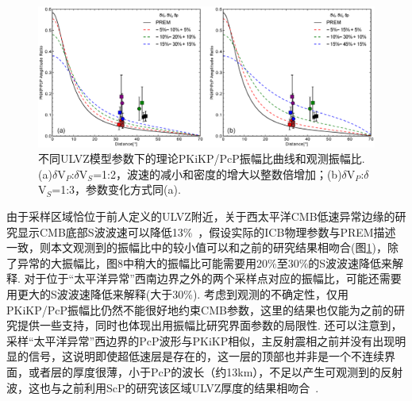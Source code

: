 
\begin{figure}[ht]
\centering
\includegraphics[width=1\linewidth]{fig/chap3/model_cmb}
\caption{不同ULVZ模型参数下的理论PKiKP/PcP振幅比曲线和观测振幅比. (a)$\delta$V${}_P$:$\delta$V${}_S$=1:2，波速的减小和密度的增大以整数倍增加；(b)$\delta$V${}_P$:$\delta$V${}_S$=1:3，参数变化方式同(a). }
\label{fig:model_cmb}
\end{figure}

由于采样区域恰位于前人定义的ULVZ附近，关于西太平洋CMB低速异常边缘的研究显示CMB底部S波波速可以降低13\%~\citep{He2006a,He2012a}，假设实际的ICB物理参数与PREM描述一致，则本文观测到的振幅比中的较小值可以和之前的研究结果相吻合(图\ref{fig:model_cmb})，除了异常的大振幅比，图8中稍大的振幅比可能需要用20\%至30\%的S波波速降低来解释. 对于位于“太平洋异常”西南边界之外的两个采样点对应的振幅比，可能还需要用更大的S波波速降低来解释(大于30\%). 考虑到观测的不确定性，仅用PKiKP/PcP振幅比仍然不能很好地约束CMB参数，这里的结果也仅能为之前的研究提供一些支持，同时也体现出用振幅比研究界面参数的局限性. 还可以注意到，采样“太平洋异常”西边界的PcP波形与PKiKP相似，主反射震相之前并没有出现明显的信号，这说明即使超低速层是存在的，这一层的顶部也并非是一个不连续界面，或者层的厚度很薄，小于PcP的波长（约13km），不足以产生可观测到的反射波，这也与之前利用ScP的研究该区域ULVZ厚度的结果相吻合~\citep{Rost2010a}.
